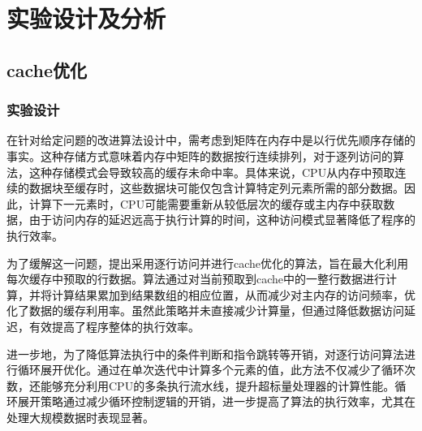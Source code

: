 \documentclass[a4paper]{article}
\begin{document}
\section{实验设计及分析}
    \subsection{cache优化}
          \subsubsection{实验设计}
                在针对给定问题的改进算法设计中，需考虑到矩阵在内存中是以行优先顺序存储的事实。这种存储方式意味着内存中矩阵的数据按行连续排列，对于逐列访问的算法，这种存储模式会导致较高的缓存未命中率。具体来说，CPU从内存中预取连续的数据块至缓存时，这些数据块可能仅包含计算特定列元素所需的部分数据。因此，计算下一元素时，CPU可能需要重新从较低层次的缓存或主内存中获取数据，由于访问内存的延迟远高于执行计算的时间，这种访问模式显著降低了程序的执行效率。
                
                为了缓解这一问题，提出采用逐行访问并进行cache优化的算法，旨在最大化利用每次缓存中预取的行数据。算法通过对当前预取到cache中的一整行数据进行计算，并将计算结果累加到结果数组的相应位置，从而减少对主内存的访问频率，优化了数据的缓存利用率。虽然此策略并未直接减少计算量，但通过降低数据访问延迟，有效提高了程序整体的执行效率。
                
                进一步地，为了降低算法执行中的条件判断和指令跳转等开销，对逐行访问算法进行循环展开优化。通过在单次迭代中计算多个元素的值，此方法不仅减少了循环次数，还能够充分利用CPU的多条执行流水线，提升超标量处理器的计算性能。循环展开策略通过减少循环控制逻辑的开销，进一步提高了算法的执行效率，尤其在处理大规模数据时表现显著。
\end{document}
